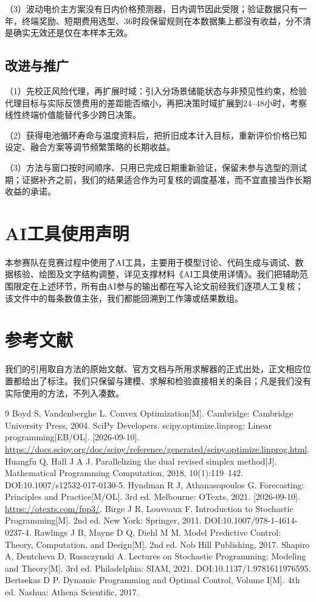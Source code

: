 \documentclass[UTF8,fontset=none,a4paper,zihao=-4]{ctexart}
\begin{document}
（3）波动电价主方案没有日内价格预测器，日内调节因此受限；验证数据只有一年，终端奖励、短期费用选型、36时段保留规则在本数据集上都没有收益，分不清是确实无效还是仅在本样本无效。

\subsection{改进与推广}
（1）先校正风险代理，再扩展时域：引入分场景储能状态与非预见性约束\cite{stochastic}，检验代理目标与实际反馈费用的差距能否缩小，再把决策时域扩展到24--48小时，考察线性终端价值能替代多少跨日决策\cite{bertsekas}。

（2）获得电池循环寿命与温度资料后，把折旧成本计入目标，重新评价价格已知设定、融合方案等调节频繁策略的长期收益。

（3）方法与窗口按时间顺序、只用已完成日期重新验证，保留未参与选型的测试期；证据补齐之前，我们的结果适合作为可复核的调度基准，而不宜直接当作长期收益的承诺。

\section*{AI工具使用声明}
本参赛队在竞赛过程中使用了AI工具，主要用于模型讨论、代码生成与调试、数据核验、绘图及文字结构调整，详见支撑材料《AI工具使用详情》。我们把辅助范围限定在上述环节，所有由AI参与的输出都在写入论文前经我们逐项人工复核；该文件中的每条数值主张，我们都能回溯到工作簿或结果数组。

\section{参考文献}
我们的引用取自方法的原始文献、官方文档与所用求解器的正式出处，正文相应位置都给出了标注。我们只保留与建模、求解和检验直接相关的条目；凡是我们没有实际使用的方法，不列入凑数。
\begingroup
\renewcommand{\refname}{参考文献}
\begin{thebibliography}{9}\footnotesize\setlength{\itemsep}{0pt}\linespread{0.93}\selectfont
{} Boyd S, Vandenberghe L. Convex Optimization[M]. Cambridge: Cambridge University Press, 2004.
 SciPy Developers. scipy.optimize.linprog: Linear programming[EB/OL]. [2026-09-10]. \url{https://docs.scipy.org/doc/scipy/reference/generated/scipy.optimize.linprog.html}.
 Huangfu Q, Hall J A J. Parallelizing the dual revised simplex method[J]. Mathematical Programming Computation, 2018, 10(1):119--142. DOI:10.1007/s12532-017-0130-5.
 Hyndman R J, Athanasopoulos G. Forecasting: Principles and Practice[M/OL]. 3rd ed. Melbourne: OTexts, 2021. [2026-09-10]. \url{https://otexts.com/fpp3/}.
 Birge J R, Louveaux F. Introduction to Stochastic Programming[M]. 2nd ed. New York: Springer, 2011. DOI:10.1007/978-1-4614-0237-4.
 Rawlings J B, Mayne D Q, Diehl M M. Model Predictive Control: Theory, Computation, and Design[M]. 2nd ed. Nob Hill Publishing, 2017.
 Shapiro A, Dentcheva D, Ruszczynski A. Lectures on Stochastic Programming: Modeling and Theory[M]. 3rd ed. Philadelphia: SIAM, 2021. DOI:10.1137/1.9781611976595.
 Bertsekas D P. Dynamic Programming and Optimal Control, Volume I[M]. 4th ed. Nashua: Athena Scientific, 2017.
\end{thebibliography}
\endgroup
\clearpage
\end{document}
